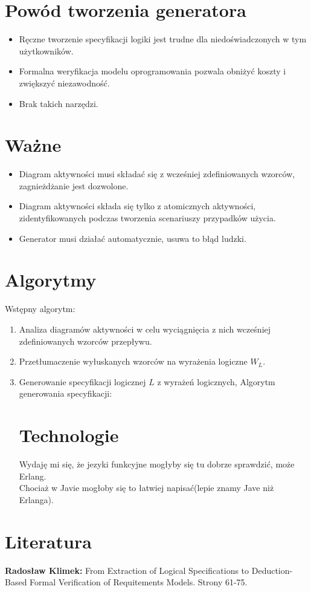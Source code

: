 \documentclass[a4paper, 11pt]{article}
\begin{document}
	\section{Powód tworzenia generatora}
	\begin{itemize}
	\item Ręczne tworzenie specyfikacji logiki jest trudne dla niedoświadczonych w tym użytkowników.
	\item Formalna weryfikacja modelu oprogramowania pozwala obniżyć koszty i zwiększyć niezawodność.
	\item Brak takich narzędzi.
	\end{itemize}
	\section{Ważne}
	\begin{itemize}
	\item Diagram aktywności musi składać się z wcześniej zdefiniowanych wzorców, zagnieżdżanie jest dozwolone.
	\item Diagram aktywności składa się tylko z atomicznych aktywności, zidentyfikowanych podczas tworzenia scenariuszy przypadków użycia.
	\item Generator musi działać automatycznie, usuwa to błąd ludzki.
	\end{itemize}
	\section{Algorytmy}
	Wstępny algorytm:
	\begin{enumerate}
	\item Analiza diagramów aktywności w celu wyciągnięcia z nich wcześniej zdefiniowanych wzorców przepływu.
	\item Przetłumaczenie wyłuskanych wzorców na wyrażenia logiczne $ W_L$.
	\item Generowanie specyfikacji logicznej $L$ z wyrażeń logicznych, %
	Algorytm generowania specyfikacji:
	
	\section{Technologie}
	Wydaję mi się, że jezyki funkcyjne mogłyby się tu dobrze sprawdzić, może Erlang.\\
	Chociaż w Javie mogłoby się to łatwiej napisać(lepie znamy Jave niż Erlanga).  
	\end{enumerate}
	
	\section{Literatura}
	\textbf{Radosław Klimek:} From Extraction of Logical Specifications to Deduction-Based Formal Verification of Requitements Models. Strony 61-75.\\
	
	
	
	
\end{document}

